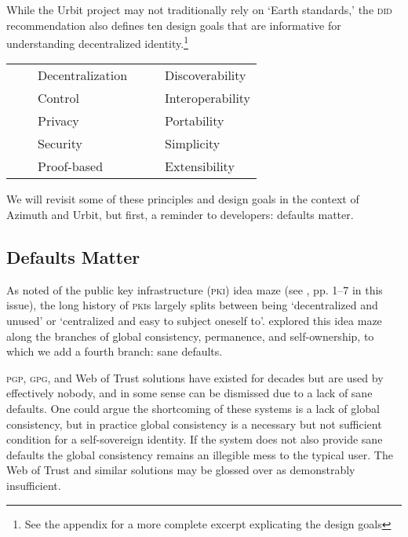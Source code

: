 \documentclass[twoside]{article}
\newcommand{\tabitem}{~~\llap{\textbullet}~~}
\begin{document}
While the Urbit project may not traditionally rely on `Earth standards,' the \textsc{did} recommendation also defines ten design goals that are informative for understanding decentralized identity.\footnote{See the appendix for a more complete excerpt explicating the design goals}

\begin{tabular}{ll}
  \tabitem  Decentralization
  &
  \tabitem  Discoverability \\
  \tabitem  Control
  &
  \tabitem  Interoperability \\
  \tabitem  Privacy
  &
  \tabitem  Portability \\
  \tabitem  Security
  &
  \tabitem  Simplicity \\
  \tabitem  Proof-based
  &
  \tabitem  Extensibility \\
\end{tabular}

We will revisit some of these principles and design goals in the context of Azimuth and Urbit, but first, a reminder to developers: defaults matter.

\subsection{Defaults Matter}

As  noted of the public key infrastructure (\textsc{pki}) idea maze (see \citet{Monk2024}, pp. 1–7 in this issue), the long history of \textsc{pki}s largely splits between being `decentralized and unused' or `centralized and easy to subject oneself to'.   explored this idea maze along the branches of global consistency, permanence, and self-ownership, to which we add a fourth branch: sane defaults.

\textsc{pgp}, \textsc{gpg}, and Web of Trust solutions have existed for decades but are used by effectively nobody, and in some sense can be dismissed due to a lack of sane defaults. One could argue the shortcoming of these systems is a lack of global consistency, but in practice global consistency is a necessary but not sufficient condition for a self-sovereign identity. If the system does not also provide sane defaults the global consistency remains an illegible mess to the typical user. The Web of Trust and similar solutions may be glossed over as demonstrably insufficient.
\end{document}
